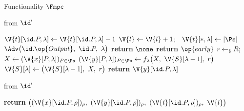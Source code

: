 \begin{interface}[nofloat]{Functionality $\Fmpc$ \\
}
{\begin{multicols}{2}
 \quad from $\id'$
\begin{algorithmic}[1]
\algcont
\Req{$\lambda \in [1,m]$}
 \label{ln:mpcowninputs}
  \State $\V{t}[\id.P,\lambda] \gets \V{t}[\id.P,\lambda] - 1$ \label{ln:mpcspend}
    \State $\V{l} \gets \V{l} + 1$; \ $\V{t}[*,\lambda] \gets |\Ps|$ \label{ln:mpcround}
  \EndIf
  \State $\Adv\bigl(\id.\op{Output},\ \id.P,\ \lambda\bigr)$
  \State \textbf{return} $\none$
\EndIf
{}
  \State \textbf{return} $\op{early}$ \label{ln:mpcearly}
\EndIf
{} \label{ln:mpcorder}
    \State $r \gets_{\$} R$; \ $X \gets (\V{x}[P,\lambda])_{P \in \Ps}$
    \State $(\V{y}[P,\lambda])_{P \in \Ps} \gets f_{\lambda}\bigl(X,\ \V{S}[\lambda-1],\ r\bigr)$ \label{ln:mpceval}
    \State $\V{S}[\lambda] \gets \bigl(\V{S}[\lambda-1],\ X,\ r\bigr)$ \label{ln:mpcstate}
  \EndIf
\EndIf
\State \textbf{return} $\V{y}[\id.P, \lambda]$ \label{ln:mpcgod}
\algsave
\end{algorithmic}
\vspace{1.4ex}

 \quad from $\id'$
\begin{algorithmic}[1]
\algcont
\State \textbf{return} $\bigl((\V{x}[\id.P,\rho])_{\rho},\ (\V{y}[\id.P,\rho])_{\rho},\ (\V{t}[\id.P,\rho])_{\rho},\ \V{l}\bigr)$ \label{ln:mpcleak}
\algsave
\end{algorithmic}
\end{multicols}}
\end{interface}
